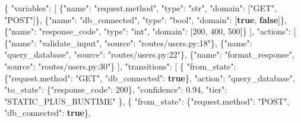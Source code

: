 \documentclass[
]{article}
\newenvironment{Shaded}{}{}
\newcommand{\DataTypeTok}[1]{\textcolor[rgb]{0.56,0.13,0.00}{#1}}
\newcommand{\DecValTok}[1]{\textcolor[rgb]{0.25,0.63,0.44}{#1}}
\newcommand{\FloatTok}[1]{\textcolor[rgb]{0.25,0.63,0.44}{#1}}
\newcommand{\FunctionTok}[1]{\textcolor[rgb]{0.02,0.16,0.49}{#1}}
\newcommand{\KeywordTok}[1]{\textcolor[rgb]{0.00,0.44,0.13}{\textbf{#1}}}
\newcommand{\OtherTok}[1]{\textcolor[rgb]{0.00,0.44,0.13}{#1}}
\newcommand{\StringTok}[1]{\textcolor[rgb]{0.25,0.44,0.63}{#1}}
\begin{document}
\begin{Shaded}
\begin{Highlighting}[]
\FunctionTok{\{}
  \DataTypeTok{"variables"}\FunctionTok{:} \OtherTok{[}
    \FunctionTok{\{}\DataTypeTok{"name"}\FunctionTok{:} \StringTok{"request.method"}\FunctionTok{,} \DataTypeTok{"type"}\FunctionTok{:} \StringTok{"str"}\FunctionTok{,} \DataTypeTok{"domain"}\FunctionTok{:} \OtherTok{[}\StringTok{"GET"}\OtherTok{,} \StringTok{"POST"}\OtherTok{]}\FunctionTok{\}}\OtherTok{,}
    \FunctionTok{\{}\DataTypeTok{"name"}\FunctionTok{:} \StringTok{"db\_connected"}\FunctionTok{,}   \DataTypeTok{"type"}\FunctionTok{:} \StringTok{"bool"}\FunctionTok{,} \DataTypeTok{"domain"}\FunctionTok{:} \OtherTok{[}\KeywordTok{true}\OtherTok{,} \KeywordTok{false}\OtherTok{]}\FunctionTok{\}}\OtherTok{,}
    \FunctionTok{\{}\DataTypeTok{"name"}\FunctionTok{:} \StringTok{"response\_code"}\FunctionTok{,}  \DataTypeTok{"type"}\FunctionTok{:} \StringTok{"int"}\FunctionTok{,}  \DataTypeTok{"domain"}\FunctionTok{:} \OtherTok{[}\DecValTok{200}\OtherTok{,} \DecValTok{400}\OtherTok{,} \DecValTok{500}\OtherTok{]}\FunctionTok{\}}
  \OtherTok{]}\FunctionTok{,}
  \DataTypeTok{"actions"}\FunctionTok{:} \OtherTok{[}
    \FunctionTok{\{}\DataTypeTok{"name"}\FunctionTok{:} \StringTok{"validate\_input"}\FunctionTok{,} \DataTypeTok{"source"}\FunctionTok{:} \StringTok{"routes/users.py:18"}\FunctionTok{\}}\OtherTok{,}
    \FunctionTok{\{}\DataTypeTok{"name"}\FunctionTok{:} \StringTok{"query\_database"}\FunctionTok{,}  \DataTypeTok{"source"}\FunctionTok{:} \StringTok{"routes/users.py:22"}\FunctionTok{\}}\OtherTok{,}
    \FunctionTok{\{}\DataTypeTok{"name"}\FunctionTok{:} \StringTok{"format\_response"}\FunctionTok{,} \DataTypeTok{"source"}\FunctionTok{:} \StringTok{"routes/users.py:30"}\FunctionTok{\}}
  \OtherTok{]}\FunctionTok{,}
  \DataTypeTok{"transitions"}\FunctionTok{:} \OtherTok{[}
    \FunctionTok{\{}
      \DataTypeTok{"from\_state"}\FunctionTok{:} \FunctionTok{\{}\DataTypeTok{"request.method"}\FunctionTok{:} \StringTok{"GET"}\FunctionTok{,} \DataTypeTok{"db\_connected"}\FunctionTok{:} \KeywordTok{true}\FunctionTok{\},}
      \DataTypeTok{"action"}\FunctionTok{:} \StringTok{"query\_database"}\FunctionTok{,}
      \DataTypeTok{"to\_state"}\FunctionTok{:} \FunctionTok{\{}\DataTypeTok{"response\_code"}\FunctionTok{:} \DecValTok{200}\FunctionTok{\},}
      \DataTypeTok{"confidence"}\FunctionTok{:} \FloatTok{0.94}\FunctionTok{,}
      \DataTypeTok{"tier"}\FunctionTok{:} \StringTok{"STATIC\_PLUS\_RUNTIME"}
    \FunctionTok{\}}\OtherTok{,}
    \FunctionTok{\{}
      \DataTypeTok{"from\_state"}\FunctionTok{:} \FunctionTok{\{}\DataTypeTok{"request.method"}\FunctionTok{:} \StringTok{"POST"}\FunctionTok{,} \DataTypeTok{"db\_connected"}\FunctionTok{:} \KeywordTok{true}\FunctionTok{\},}

\end{Highlighting}
\end{Shaded}
\end{document}
